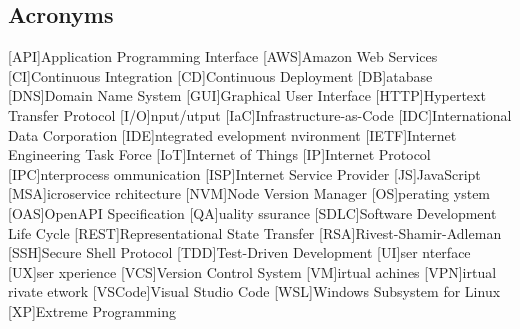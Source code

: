 \newcommand{\abbr}{Abbreviations}
\subsection{Acronyms}

\begin{acronym}[1234567890]		%
\setlength{\itemsep}{-\parsep}	%

[API]{Application Programming Interface}
[AWS]{Amazon Web Services}
[CI]{Continuous Integration}
[CD]{Continuous Deployment}
[DB]{atabase}
[DNS]{Domain Name System}
[GUI]{Graphical User Interface}
[HTTP]{Hypertext Transfer Protocol}
[I/O]{nput/utput}
[IaC]{Infrastructure-as-Code}
[IDC]{International Data Corporation}
[IDE]{ntegrated evelopment nvironment}
[IETF]{Internet Engineering Task Force}
[IoT]{Internet of Things}
[IP]{Internet Protocol}
[IPC]{nterprocess ommunication}
[ISP]{Internet Service Provider}
[JS]{JavaScript}
[MSA]{icroservice rchitecture}
[NVM]{Node Version Manager}
[OS]{perating ystem}
[OAS]{OpenAPI Specification}
[QA]{uality ssurance}
[SDLC]{Software Development Life Cycle}
[REST]{Representational State Transfer}
[RSA]{Rivest-Shamir-Adleman}
[SSH]{Secure Shell Protocol}
[TDD]{Test-Driven Development}
[UI]{ser nterface}
[UX]{ser xperience}
[VCS]{Version Control System}
[VM]{irtual achines}
[VPN]{irtual rivate etwork}
[VSCode]{Visual Studio Code}
[WSL]{Windows Subsystem for Linux}
[XP]{Extreme Programming}
\end{acronym}
